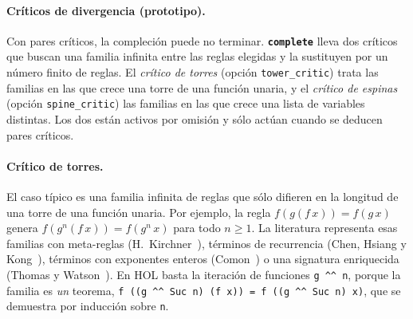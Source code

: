 \documentclass[11pt,a4paper]{article}
\newcommand{\isa}[1]{\texttt{#1}}
\newcommand{\cmd}[1]{\textbf{\texttt{#1}}}
\theoremstyle{definition}
\theoremstyle{remark}
\begin{document}
\paragraph{Críticos de divergencia (prototipo).}
Con pares críticos, la compleción puede no terminar. \cmd{complete} lleva dos
críticos que buscan una familia infinita entre las reglas elegidas y la sustituyen
por un número finito de reglas. El \emph{crítico de torres} (opción
\isa{tower\_critic}) trata las familias en las que crece una torre de una función
unaria, y el \emph{crítico de espinas} (opción \isa{spine\_critic}) las familias en
las que crece una lista de variables distintas. Los dos están activos por omisión
y sólo actúan cuando se deducen pares críticos.

\paragraph{Crítico de torres.}
El caso típico es una familia infinita de reglas que sólo difieren en la longitud
de una torre de una función unaria. Por ejemplo, la regla $f(g(f\,x)) = f(g\,x)$ genera
$f(g^n(f\,x)) = f(g^n\,x)$ para todo $n \ge 1$. La literatura representa esas
familias con meta-reglas (H.~Kirchner~\cite{kirchner89}), términos de recurrencia
(Chen, Hsiang y Kong~\cite{chen-hsiang-kong}), términos con exponentes
enteros (Comon~\cite{comon95}) o una signatura enriquecida (Thomas y
Watson~\cite{thomas-watson}). En HOL basta la iteración de funciones
\isa{g \textasciicircum\textasciicircum\ n}, porque la familia es \emph{un} teorema,
\isa{f ((g \textasciicircum\textasciicircum\ Suc n) (f x)) = f ((g \textasciicircum\textasciicircum\ Suc n) x)},
que se demuestra por inducción sobre \isa{n}.
\end{document}
